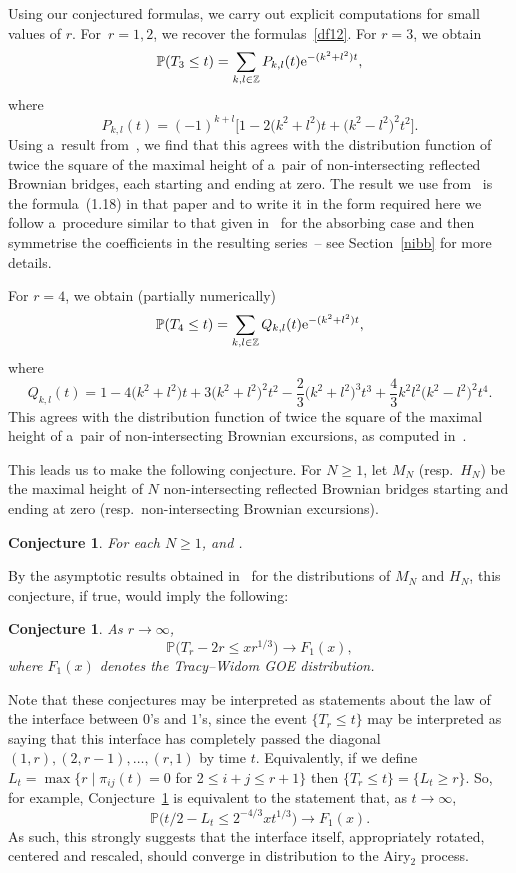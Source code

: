 \documentclass[pdftex]{sigma}
\newtheorem{conj}[thm]{Conjecture}
\theoremstyle{definition}
\newcommand\Z{{\mathbb Z}}
\renewcommand\P{{\mathbb P}}
\def\ed{\stackrel{{\rm d}}{=}}
\begin{document}
Using our conjectured formulas, we carry out explicit computations for small values of $r$.
For~${r=1,2}$, we recover the formulas~\eqref{df12}.
For $r=3$, we obtain
\[
\P(T_3\le t) = \sum_{k,l\in\Z} P_{k,l}(t) {\rm e}^{-(k^2+l^2)t},
\]
where
\[P_{k,l}(t) = (-1)^{k+l} \big[1 - 2\big(k^2+l^2\big) t + \big(k^2-l^2\big)^2 t^2\big].\]
Using a~result from~\cite{lie},
we find that this agrees with the distribution function of
twice the square of the maximal height of a~pair of non-intersecting reflected Brownian bridges,
each starting and ending at zero.
The result we use from~\cite{lie} is the formula~(1.18) in that paper and to write it in the form required here we follow a~procedure similar to that given in~\cite{kat} for the absorbing case and then symmetrise the coefficients in the resulting
series~-- see Section~\ref{nibb} for more details.

For $r=4$, we obtain (partially numerically)
\[
\P(T_4\le t) = \sum_{k,l\in\Z} Q_{k,l}(t) {\rm e}^{-(k^2+l^2)t},
\]
where
\[
Q_{k,l}(t) = 1 - 4\big(k^2+l^2\big) t + 3\big(k^2+l^2\big)^2t^2
 -\frac23\big(k^2+l^2\big)^3t^3+\frac43 k^2l^2\big(k^2-l^2\big)^2 t^4.\]
This agrees with the distribution function of twice
the square of the maximal height of a~pair of non-intersecting Brownian excursions,
as computed in~\cite{f,kat,smcrf}.

This leads us to make the following conjecture. For $N\ge 1$, let $M_N$ (resp.\ $H_N$)
be the maximal height of $N$ non-intersecting reflected Brownian bridges starting and ending
at zero (resp.\ non-intersecting Brownian excursions).

\begin{conj} For each $N\ge 1$, \smash{$T_{2N-1}\ed 2(M_N)^2$}
and \smash{$T_{2N}\ed 2(H_N)^2$}.
\end{conj}

By the asymptotic results obtained in~\cite{lie} for the distributions of $M_N$
and $H_N$, this conjecture, if true, would imply the following:

\begin{conj}\label{conjecture1.2} As $r\to\infty$,
\[\P\big(T_r-2r\le xr^{1/3}\big) \to F_1 (x),
\]
where $F_1 (x)$ denotes the Tracy--Widom GOE distribution.
\end{conj}

Note that these conjectures may be interpreted as statements about the law of the interface between $0$'s and $1$'s, since the event $\{T_r\le t\}$ may be interpreted as saying that this interface has completely passed the diagonal $(1,r),(2,r-1),\dots, (r,1)$ by time $t$. Equivalently, if we define~${L_t=\max\{r \mid \pi_{ij}(t)=0}$ for 2$\le i+j\le r+1\}$ then $\{T_r\le t\}=\{L_t\ge r\}$. So, for example, Conjecture~\ref{conjecture1.2} is equivalent to the statement that, as $t\to\infty$,
\[\P\big(t/2-L_t \le 2^{-4/3} xt^{1/3}\big) \to F_1 (x).\]
As such, this strongly suggests that the interface itself, appropriately rotated, centered and rescaled, should converge in distribution to the Airy${}_2$ process.
\end{document}
